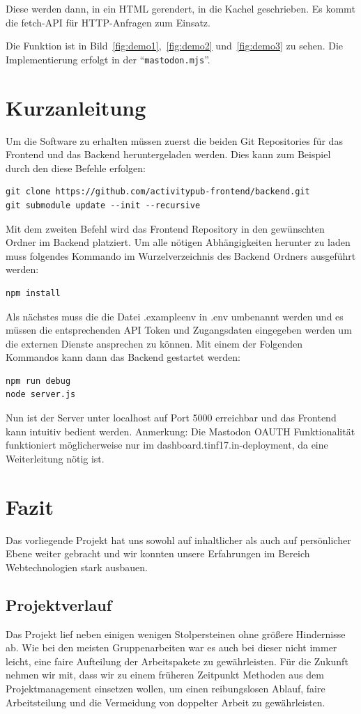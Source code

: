 \documentclass[fleqn,10pt]{SelfArx} %
\begin{document}
Diese werden dann, in ein HTML gerendert, in die Kachel geschrieben. Es kommt die fetch-API für HTTP-Anfragen zum Einsatz.

Die Funktion ist in Bild~\ref{fig:demo1},~\ref{fig:demo2} und~\ref{fig:demo3} zu sehen. Die Implementierung erfolgt in der \enquote{\texttt{mastodon.mjs}}.

\section{Kurzanleitung}
Um die Software zu erhalten müssen zuerst die beiden Git Repositories für das Frontend und das Backend heruntergeladen werden. Dies kann zum Beispiel durch den diese Befehle erfolgen:
\begin{lstlisting}
git clone https://github.com/activitypub-frontend/backend.git
git submodule update --init --recursive
\end{lstlisting}
Mit dem zweiten Befehl wird das Frontend Repository in den gewünschten Ordner im Backend platziert.
Um alle nötigen Abhängigkeiten herunter zu laden muss folgendes Kommando im Wurzelverzeichnis des Backend Ordners ausgeführt werden:
\begin{lstlisting}
npm install
\end{lstlisting}
Als nächstes muss die die Datei .exampleenv in .env umbenannt werden und es müssen die entsprechenden API Token und Zugangsdaten eingegeben werden um die externen Dienste ansprechen zu können.
Mit einem der Folgenden Kommandos kann dann das Backend gestartet werden:
\begin{lstlisting}
npm run debug
node server.js
\end{lstlisting}
Nun ist der Server unter localhost auf Port 5000 erreichbar und das Frontend kann intuitiv bedient werden.
Anmerkung: Die Mastodon OAUTH Funktionalität funktioniert möglicherweise nur im dashboard.tinf17.in-deployment, da eine Weiterleitung nötig ist.
\section{Fazit}
Das vorliegende Projekt hat uns sowohl auf inhaltlicher als auch auf persönlicher Ebene weiter gebracht und wir konnten unsere Erfahrungen im Bereich Webtechnologien stark ausbauen.
\subsection{Projektverlauf}
Das Projekt lief neben einigen wenigen Stolpersteinen ohne größere Hindernisse ab. Wie bei den meisten Gruppenarbeiten war es auch bei dieser nicht immer leicht, eine faire Aufteilung der Arbeitspakete zu gewährleisten. Für die Zukunft nehmen wir mit, dass wir zu einem früheren Zeitpunkt Methoden aus dem Projektmanagement einsetzen wollen, um einen reibungslosen Ablauf, faire Arbeitsteilung und die Vermeidung von doppelter Arbeit zu gewährleisten.
\end{document}
